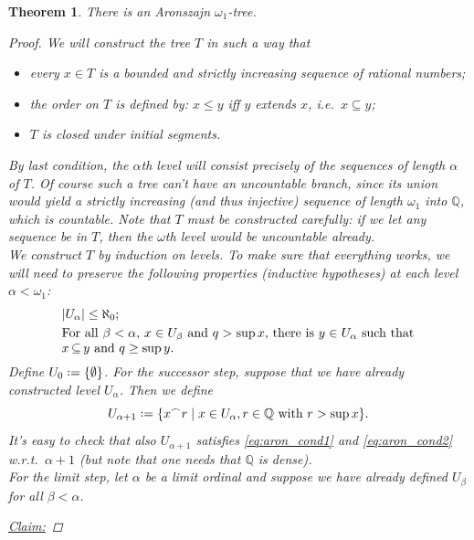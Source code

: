 \documentclass[11pt,a4paper]{report}
\newtheorem{theorem}{Theorem}[chapter] %
\theoremstyle{definition}
\theoremstyle{num.custom-title}
\theoremstyle{custom-title}
\newenvironment{claim}[1]{\par\noindent\underline{Claim#1:}\space}{} %
\DeclareMathOperator{\sse}{\subseteq}
\newcommand{\Q}{\mathbb{Q}}
\newcommand{\conc}{^\frown}
\newcommand*{\defeq}{\mathrel{\rlap{%
                     \raisebox{0.3ex}{$\cdot$}}%
                     \raisebox{-0.3ex}{$\cdot$}}%
                     =}
\begin{document}
\begin{theorem}\label{thm-aronszajn}
There is an Aronszajn $\omega_1$-tree.
\begin{proof}
We will construct the tree $T$ in such a way that

\begin{itemize}
\item every $x \in T$ is a bounded and strictly increasing sequence of rational numbers;
\item the order on $T$ is defined by: $x \leq y$ iff $y$ extends $x$, i.e.\ $x \sse y$;
\item $T$ is closed under initial segments.
\end{itemize}
%
By last condition, the $\alpha$th level will consist precisely of the sequences of length $\alpha$ of $T$. Of course such a tree can't have an uncountable branch, since its union would yield a strictly increasing (and thus injective) sequence of length $\omega_1$ into $\Q$, which is countable. Note that $T$ must be constructed carefully: if we let any sequence be in $T$, then the $\omega$th level would be uncountable already.\\
We construct $T$ by induction on levels. To make sure that everything works, we will need to preserve the following properties (inductive hypotheses) at each level $\alpha<\omega_1$:
%
\begin{align}
\label{eq:aron_cond1}
\begin{minipage}[t]{0.8\textwidth}
$|U_\alpha| \leq \aleph_0$;
\end{minipage}
\\
\label{eq:aron_cond2}
\begin{minipage}[t]{0.8\textwidth}
For all $\beta < \alpha$, $x \in U_\beta$ and $q > \sup x$, there is $y \in U_\alpha$ such that $x \sse y$ and $q \geq \sup y$.
\end{minipage}
\end{align}
%
Define $U_0 \defeq \{\emptyset\}$. For the successor step, suppose that we have already constructed level $U_\alpha$. Then we define
\[
U_{\alpha+1} \defeq \{ x \conc r \mid x \in U_\alpha, r \in \Q \text{ with } r > \sup x \}.
\]
It's easy to check that also $U_{\alpha+1}$ satisfies \eqref{eq:aron_cond1} and \eqref{eq:aron_cond2} w.r.t.\ $\alpha+1$ (but note that one needs that $\Q$ is dense).\\
For the limit step, let $\alpha$ be a limit ordinal and suppose we have already defined $U_\beta$ for all $\beta<\alpha$.
\begin{claim}{}

\end{claim}
\end{proof}
\end{theorem}
\end{document}
